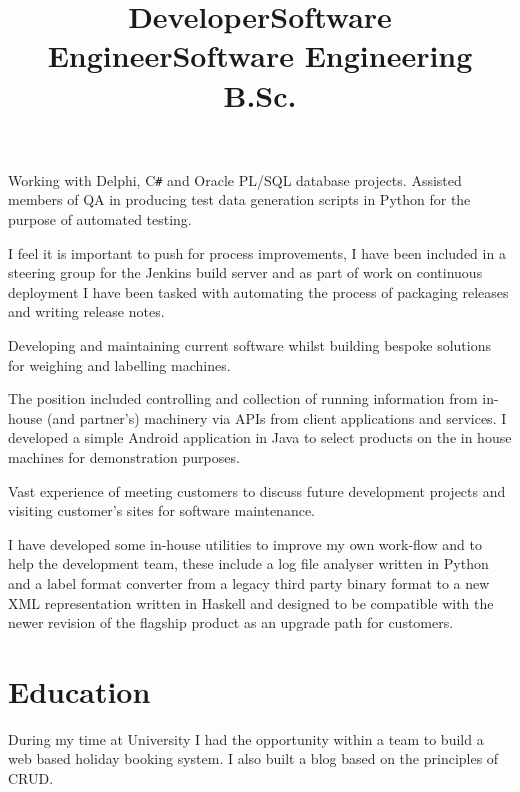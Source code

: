 \documentclass[line,margin]{res}
\newcommand{\CSharp}{C\texttt{\#}}
\begin{document}
\begin{resume}
\title{Developer}
\begin{position}
Working with Delphi, {\CSharp} and Oracle PL/SQL database projects.
Assisted members of QA in producing test data generation scripts in Python for the purpose of automated testing.

I feel it is important to push for process improvements, I have been included in a steering group for the Jenkins build server and as part of work on continuous deployment I have been tasked with automating the process of packaging releases and writing release notes.
\end{position}

\title{Software Engineer}
\begin{position}
Developing and maintaining current software whilst building bespoke solutions for weighing and labelling machines.

The position included controlling and collection of running information from in-house (and partner's) machinery via APIs from client applications and services.
I developed a simple Android application in Java to select products on the in house machines for demonstration purposes.

Vast experience of meeting customers to discuss future development projects and visiting customer's sites for software maintenance.

I have developed some in-house utilities to improve my own work-flow and to help the development team, these include a log file analyser written in Python and a label format converter from a legacy third party binary format to a new XML representation written in Haskell and designed to be compatible with the newer revision of the flagship product as an upgrade path for customers.
\end{position}

\section{Education}

\title{Software Engineering B.Sc.} %
\begin{position}
During my time at University I had the opportunity within a team to build a web based holiday booking system.
I also built a blog based on the principles of CRUD.


\end{position}
\end{resume}
\end{document}
